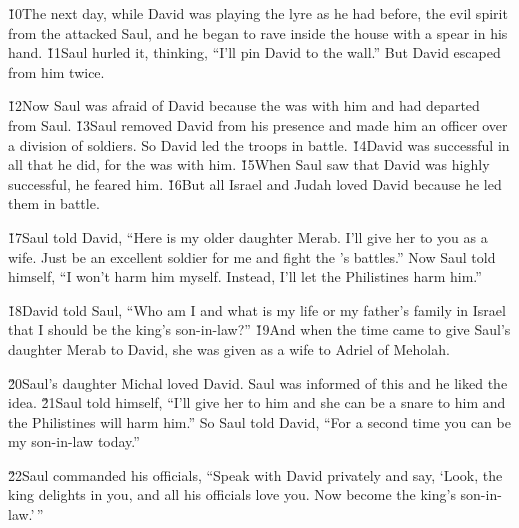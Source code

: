 \v{10}The next day, while David was playing the lyre as he had before, the evil spirit from the  attacked Saul, and he began to rave inside the house with a spear in his hand. \v{11}Saul hurled it, thinking, ``I'll pin David to the wall.'' But David escaped from him twice.

\v{12}Now Saul was afraid of David because the  was with him and had departed from Saul. \v{13}Saul removed David from his presence and made him an officer over a division of soldiers. So David led the troops in battle. \v{14}David was successful in all that he did, for the  was with him. \v{15}When Saul saw that David was highly successful, he feared him. \v{16}But all Israel and Judah loved David because he led them in battle.

\v{17}Saul told David, ``Here is my older daughter Merab. I'll give her to you as a wife. Just be an excellent soldier for me and fight the 's battles.'' Now Saul told himself, ``I won't harm him myself. Instead, I'll let the Philistines harm him.''

\v{18}David told Saul, ``Who am I and what is my life or my father's family in Israel that I should be the king's son-in-law?'' \v{19}And when the time came to give Saul's daughter Merab to David, she was given as a wife to Adriel of Meholah.

\v{20}Saul's daughter Michal loved David. Saul was informed of this and he liked the idea. \v{21}Saul told himself, ``I'll give her to him and she can be a snare to him and the Philistines will harm him.'' So Saul told David, ``For a second time you can be my son-in-law today.''

\v{22}Saul commanded his officials, ``Speak with David privately and say, `Look, the king delights in you, and all his officials love you. Now become the king's son-in-law.'\,''

